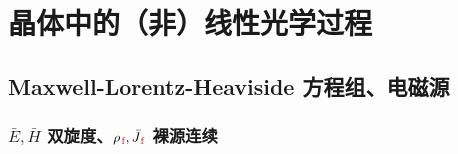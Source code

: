 \chapter{晶体中的（非）线性光学过程}\label{chap:N/LCO}

\section{Maxwell-Lorentz-Heaviside 方程组、电磁源}\label{sec:maxwell}

\subsection{$\bar{E},\bar{H}$ 双旋度、${\rho}_{\;\!\textcolor{Maroon}{\text{f}}}, \bar{J}_{\;\!\textcolor{Maroon}{\text{f}}}$ 裸源连续}\label{ssec:eh}

